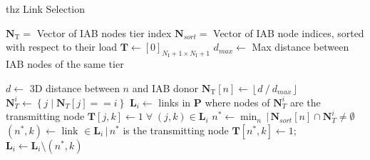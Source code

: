 \begin{algorithm}[t]
\small
	\caption{\gls{thz} Link Selection}
	\begin{algorithmic}
        \State $\bm{N}_{\mathrm{T}} =$ Vector of IAB nodes tier index
        \State $\bm{N}_{sort} =$ Vector of IAB node indices, sorted with respect to their load 
        \State $\bm{T} \gets [0]_{N_{\mathrm{I}} + 1 \times N_{\mathrm{I}} + 1} $
        \State $d_{max} \gets$ Max distance between IAB nodes of the same tier
        
            \State $d \gets $ 3D distance between $n$ and IAB donor
            \State $\bm{N}_{\mathrm{T}}[n] \gets \left\lfloor d~/~d_{max} \right\rfloor $
        \EndFor
                \State $\bm{N}_{T}^{i} \gets \left\{ j  \; | \; \bm{N}_{T}[j] == i \right\}$ 
                \State $\bm{L}_{i} \gets$ links in $\bm{P}$ where nodes of $\bm{N}_{T}^{i}$ are the transmitting node 
                    \State $\bm{T}[j, k] \gets 1 \; \forall \; (j, k) \in \bm{L}_i$ 
                \Else
                    \State $n^{*} \gets \operatorname{min}_n \, | \, \bm{N}_{sort} [n] \cap \bm{N}_{T}^{i} \neq \emptyset $ 
                    \State $(n^{*}, k) \gets \text{ link } \in \bm{L}_{i} \, | \, n^{*}$ is the transmitting node
                    \State $\bm{T} [n^{*}, k] \gets 1$; $\bm{L}_{i} \gets \bm{L}_{i} \setminus (n^{*}, k) $ 
                    \EndWhile
                \EndIf                
	\EndFor
	\end{algorithmic} 
\label{algo:thzLink}
\end{algorithm}


